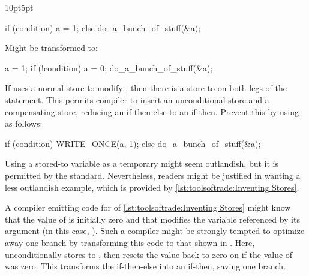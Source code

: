 \begin{description}[labelsep=.4em]
\begin{listing}[tb]
\begin{adjustwidth}{10pt}{5pt}
\footnotesize
\renewcommand{\myfvline}{A\arabic{FancyVerbLine}}
\begin{fcvlabel}
\begin{VerbatimT}[commandchars=\\\[\]]
if (condition)				\lnlbl[A1]
	a = 1;				\lnlbl[A2]
else					\lnlbl[A3]
	do_a_bunch_of_stuff(&a);	\lnlbl[A4]
\end{VerbatimT}
Might be transformed to:
\renewcommand{\myfvline}{B\arabic{FancyVerbLine}}
\begin{VerbatimT}[commandchars=\\\[\]]
a = 1;					\lnlbl[B1]
if (!condition) {			\lnlbl[B2]
	a = 0;				\lnlbl[B3]
	do_a_bunch_of_stuff(&a);	\lnlbl[B4]
}					\lnlbl[B5]
\end{VerbatimT}
If  uses a normal store to modify , then
there is a store to  on both legs of the  statement.
This permits compiler to insert an unconditional store and a compensating
store, reducing an if-then-else to an if-then.
Prevent this by using  as follows:
\renewcommand{\myfvline}{C\arabic{FancyVerbLine}}
\begin{VerbatimT}[commandchars=\\\[\]]
if (condition)				\lnlbl[C1]
	WRITE_ONCE(a, 1);		\lnlbl[C2]
else					\lnlbl[C3]
	do_a_bunch_of_stuff(&a);	\lnlbl[C4]
\end{VerbatimT}
\end{fcvlabel}
\end{adjustwidth}
\caption{Inventing Stores}
\label{lst:toolsoftrade:Inventing Stores}
\end{listing}

Using a stored-to variable as a temporary might seem outlandish,
but it is permitted by the standard.
Nevertheless, readers might be justified in wanting a less
outlandish example, which is provided by
\cref{lst:toolsoftrade:Inventing Stores}.

\begin{fcvref}
A compiler emitting code for  of
\cref{lst:toolsoftrade:Inventing Stores}
might know that the value of  is initially zero and that
 modifies the variable referenced by its
argument (in this case, ).
Such a compiler might be strongly tempted to optimize away one branch
by transforming this code to that shown in .
Here,  unconditionally stores  to , then resets the
value back to zero on  if the value of  was zero.
This transforms the if-then-else into an if-then, saving one branch.
\end{fcvref}


\end{description}
